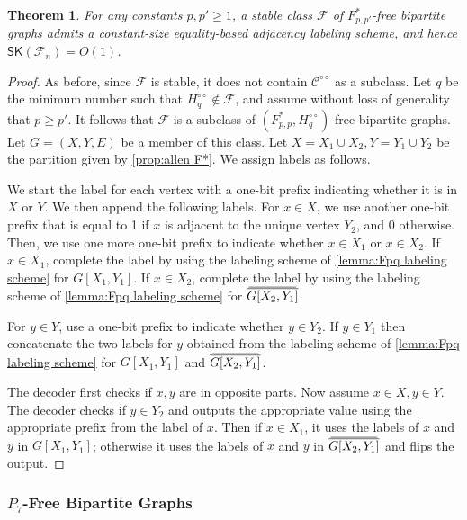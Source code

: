 \documentclass{article}
\newtheorem{theorem}{Theorem}\newtheorem{lemma}[theorem]{Lemma}\newtheorem{proposition}[theorem]{Proposition}\newtheorem{corollary}[theorem]{Corollary}\newtheorem{definition}[theorem]{Definition}\newtheorem{claim}[theorem]{Claim}\newtheorem{remark}[theorem]{Remark}\newtheorem{observation}[theorem]{Observation}\newtheorem{conjecture}[theorem]{Conjecture}\newtheorem{example}[theorem]{Example}
\newcommand{\cC}{\ensuremath{\mathcal{C}}}
\newcommand{\cF}{\ensuremath{\mathcal{F}}}
\newcommand\doverline[1]{%
  \setbox0=\hbox{$\!\overline{#1}\!$}%
  \ht0=\dimexpr\ht0-.2ex\relax%
  \,\overline{\copy0}\,%
}
\newcommand{\bc}[1]{\doverline{#1}} %
\newcommand{\RL}{\mathsf{SK}}
\newcommand{\dcirc}{{\circ\circ}}
\begin{document}
\begin{theorem}
\label{th:Fpq labeling}
For any constants $p,p' \geq 1$, a stable class $\cF$ of $F^*_{p,p'}$-free bipartite graphs 
admits a constant-size equality-based adjacency labeling scheme, and hence $\RL(\cF_n) = O(1)$.
\end{theorem}
\begin{proof}
	As before, since $\cF$ is stable, it does not contain $\cC^\dcirc$ as a subclass.
	Let $q$ be the minimum number such that $H^{\circ\circ}_q \not\in \cF$, and 
	assume without loss of generality that $p \geq p'$.
	It follows that $\cF$ is a subclass of $(F^*_{p,p}, H^{\circ\circ}_q)$-free bipartite
	graphs. Let $G = (X,Y,E)$ be a member of this class. Let $X=X_1\cup X_2, Y = Y_1 \cup Y_2$ be the partition given by \cref{prop:allen F*}. We assign labels as follows.

We start the label for each vertex with a one-bit prefix indicating whether it is in $X$ or $Y$. We
then append the following labels. For $x \in X$, we use another one-bit prefix that is equal to 1 if $x$ is adjacent to the unique vertex $Y_2$, and 0 otherwise. Then, we use one more one-bit prefix to indicate whether $x \in X_1$ or $x \in X_2$. If $x \in X_1$, complete the label by using the labeling scheme of \cref{lemma:Fpq labeling scheme} for $G[X_1,Y_1]$. If $x \in X_2$, complete the label by using the labeling scheme of \cref{lemma:Fpq labeling scheme} for $\bc{G[X_2,Y_1]}$.

For $y \in Y$, use a one-bit prefix to indicate whether $y \in Y_2$. If $y \in Y_1$ then concatenate the two labels for $y$ obtained from the labeling scheme of \cref{lemma:Fpq labeling scheme} for
$G[X_1,Y_1]$ and $\bc{G[X_2,Y_1]}$.

The decoder first checks if $x,y$ are in opposite parts. Now assume $x \in X, y \in Y$. The decoder
checks if $y \in Y_2$ and outputs the appropriate value using the appropriate prefix from the label of
$x$. Then if $x \in X_1$, it uses the labels of $x$ and $y$ in $G[X_1,Y_1]$; otherwise it uses the
labels of $x$ and $y$ in $\bc{G[X_2,Y_1]}$ and flips the output.
\end{proof}





\subsubsection{\texorpdfstring{$P_7$}{P7}-Free Bipartite Graphs}
\label{subsection:P7}
\end{document}
